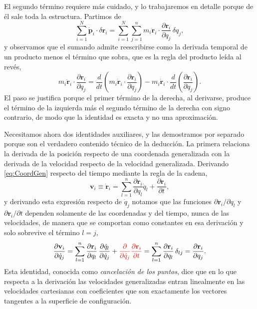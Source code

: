         El segundo término requiere más cuidado, y lo trabajaremos en detalle porque de él sale toda la estructura. Partimos de
        \begin{equation}\label{eq:TerminoInercial}
            \sum_{i=1}^{N}\dot{\mathbf{p}}_{i}\cdot\delta\mathbf{r}_{i}
            = \sum_{i=1}^{N}\sum_{j=1}^{n} m_{i}\ddot{\mathbf{r}}_{i}\cdot\frac{\partial\mathbf{r}_{i}}{\partial q_{j}}\,\delta q_{j},
        \end{equation}
        y observamos que el sumando admite reescribirse como la derivada temporal de un producto menos el término que sobra, que es la regla del producto leída al revés,
        \begin{equation}\label{eq:ReglaProductoInversa}
            m_{i}\ddot{\mathbf{r}}_{i}\cdot\frac{\partial\mathbf{r}_{i}}{\partial q_{j}}
            = \frac{d}{dt}\left(m_{i}\dot{\mathbf{r}}_{i}\cdot\frac{\partial\mathbf{r}_{i}}{\partial q_{j}}\right)
            - m_{i}\dot{\mathbf{r}}_{i}\cdot\frac{d}{dt}\left(\frac{\partial\mathbf{r}_{i}}{\partial q_{j}}\right).
        \end{equation}
        El paso se justifica porque el primer término de la derecha, al derivarse, produce el término de la izquierda más el segundo término de la derecha con signo contrario, de modo que la identidad es exacta y no una aproximación.

        Necesitamos ahora dos identidades auxiliares, y las demostramos por separado porque son el verdadero contenido técnico de la deducción. La primera relaciona la derivada de la posición respecto de una coordenada generalizada con la derivada de la velocidad respecto de la velocidad generalizada. Derivando \eqref{eq:CoordGen} respecto del tiempo mediante la regla de la cadena,
        \begin{equation}\label{eq:VelocidadCadena}
            \mathbf{v}_{i} \equiv \dot{\mathbf{r}}_{i} = \sum_{l=1}^{n}\frac{\partial\mathbf{r}_{i}}{\partial q_{l}}\dot{q}_{l} + \frac{\partial\mathbf{r}_{i}}{\partial t},
        \end{equation}
        y derivando esta expresión respecto de $\dot{q}_{j}$ notamos que las funciones $\partial\mathbf{r}_{i}/\partial q_{l}$ y $\partial\mathbf{r}_{i}/\partial t$ dependen solamente de las coordenadas y del tiempo, nunca de las velocidades, de manera que se comportan como constantes en esa derivación y solo sobrevive el término $l = j$,
        \begin{equation}\label{eq:CancelacionPuntos}
            \frac{\partial\mathbf{v}_{i}}{\partial\dot{q}_{j}}
            = \sum_{l=1}^{n}\frac{\partial\mathbf{r}_{i}}{\partial q_{l}}\,\frac{\partial\dot{q}_{l}}{\partial\dot{q}_{j}}
            + \textcolor{red}{\frac{\partial}{\partial\dot{q}_{j}}\frac{\partial\mathbf{r}_{i}}{\partial t}}
            = \sum_{l=1}^{n}\frac{\partial\mathbf{r}_{i}}{\partial q_{l}}\,\delta_{lj}
            = \frac{\partial\mathbf{r}_{i}}{\partial q_{j}} .
        \end{equation}
        Esta identidad, conocida como \textit{cancelación de los puntos}, dice que en lo que respecta a la derivación las velocidades generalizadas entran linealmente en las velocidades cartesianas con coeficientes que son exactamente los vectores tangentes a la superficie de configuración.

